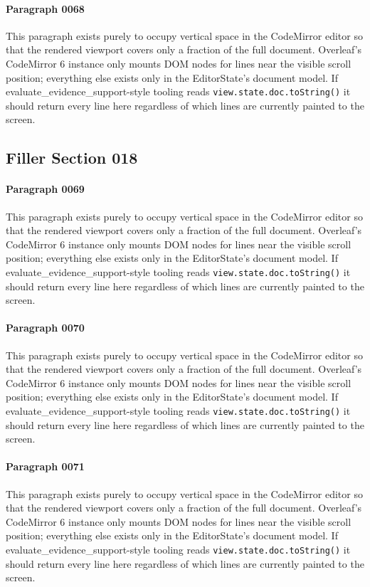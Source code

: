 \documentclass{article}
\begin{document}
\paragraph{Paragraph 0068}
This paragraph exists purely to occupy vertical space in the CodeMirror editor so that the rendered viewport covers only a fraction of the full document. Overleaf's CodeMirror 6 instance only mounts DOM nodes for lines near the visible scroll position; everything else exists only in the EditorState's document model. If evaluate\_evidence\_support-style tooling reads \texttt{view.state.doc.toString()} it should return every line here regardless of which lines are currently painted to the screen.

\subsection{Filler Section 018}
\paragraph{Paragraph 0069}
This paragraph exists purely to occupy vertical space in the CodeMirror editor so that the rendered viewport covers only a fraction of the full document. Overleaf's CodeMirror 6 instance only mounts DOM nodes for lines near the visible scroll position; everything else exists only in the EditorState's document model. If evaluate\_evidence\_support-style tooling reads \texttt{view.state.doc.toString()} it should return every line here regardless of which lines are currently painted to the screen.

\paragraph{Paragraph 0070}
This paragraph exists purely to occupy vertical space in the CodeMirror editor so that the rendered viewport covers only a fraction of the full document. Overleaf's CodeMirror 6 instance only mounts DOM nodes for lines near the visible scroll position; everything else exists only in the EditorState's document model. If evaluate\_evidence\_support-style tooling reads \texttt{view.state.doc.toString()} it should return every line here regardless of which lines are currently painted to the screen.

\paragraph{Paragraph 0071}
This paragraph exists purely to occupy vertical space in the CodeMirror editor so that the rendered viewport covers only a fraction of the full document. Overleaf's CodeMirror 6 instance only mounts DOM nodes for lines near the visible scroll position; everything else exists only in the EditorState's document model. If evaluate\_evidence\_support-style tooling reads \texttt{view.state.doc.toString()} it should return every line here regardless of which lines are currently painted to the screen.
\end{document}

